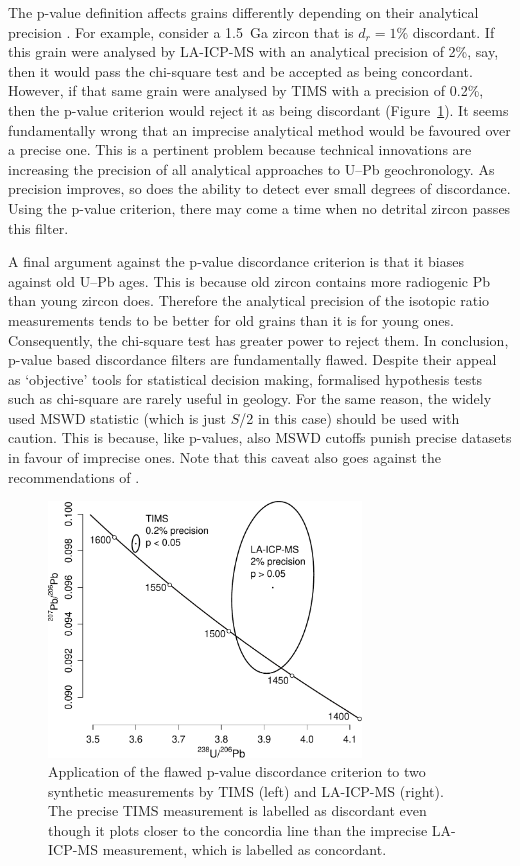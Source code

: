 \documentclass[gchron, manuscript]{copernicus}
\begin{document}
The p-value definition affects grains differently depending on their
analytical precision \citep{nemchin2005}. For example, consider a
1.5~Ga zircon that is $d_r=1\%$ discordant. If this grain were
analysed by LA-ICP-MS with an analytical precision of 2\%, say, then
it would pass the chi-square test and be accepted as being
concordant. However, if that same grain were analysed by TIMS with a
precision of 0.2\%, then the p-value criterion would reject it as
being discordant (Figure~\ref{fig:TIMSvsLAICPMS}). It seems
fundamentally wrong that an imprecise analytical method would be
favoured over a precise one. This is a pertinent problem because
technical innovations are increasing the precision of all analytical
approaches to U--Pb geochronology.  As precision improves, so does the
ability to detect ever small degrees of discordance. Using the p-value
criterion, there may come a time when no detrital zircon passes this
filter.

A final argument against the p-value discordance criterion is that it
biases against old U--Pb ages. This is because old zircon contains
more radiogenic Pb than young zircon does. Therefore the analytical
precision of the isotopic ratio measurements tends to be better for
old grains than it is for young ones. Consequently, the chi-square
test has greater power \citep[\emph{sensu}][]{cohen1992} to reject
them. In conclusion, p-value based discordance filters are
fundamentally flawed. Despite their appeal as `objective' tools for
statistical decision making, formalised hypothesis tests such as
chi-square are rarely useful in geology. For the same reason, the
widely used MSWD \citep[Mean Square of the Weighted
  Deviates,][]{mcintyre1966} statistic (which is just $S$/2 in this
case) should be used with caution. This is because, like p-values,
also MSWD cutoffs punish precise datasets in favour of imprecise
ones. Note that this caveat also goes against the recommendations of
\citet{spencer2016}.

\begin{figure}[t]
  \includegraphics[width=8.3cm]{TIMSvsICPMS.pdf}
  \caption{Application of the flawed p-value discordance criterion
    to two synthetic measurements by TIMS (left) and LA-ICP-MS
    (right).  The precise TIMS measurement is labelled as discordant
    even though it plots closer to the concordia line than the
    imprecise LA-ICP-MS measurement, which is labelled as
    concordant.
  }
  \label{fig:TIMSvsLAICPMS}
\end{figure}
\end{document}
